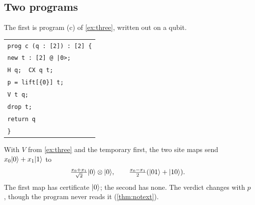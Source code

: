 \documentclass[acmsmall,screen,review,anonymous,nonacm]{acmart}
\begin{document}
\subsection{Two programs}\label{sec:meas:programs}

The first is program (c) of \cref{ex:three}, written out on a qubit.\par\nopagebreak[4]
\noindent
\begin{minipage}[t]{0.36\linewidth}
\vspace{0pt}
\small\begin{tabular}[t]{@{}l@{}}
\texttt{prog c (q : [2]) : [2] \{}\\
\texttt{\quad new t : [2] @ |0>;}\\
\texttt{\quad H q;\ \ CX q t;}\\
\texttt{\quad p = lift[\{0\}] t;}\\
\texttt{\quad V t q;}\\
\texttt{\quad drop t;}\\
\texttt{\quad return q}\\
\texttt{\}}\\
\end{tabular}
\end{minipage}\hfill
\begin{minipage}[t]{0.61\linewidth}
\vspace{0pt}
\raggedright
With $V$ from \cref{ex:three} and the temporary first, the two site
maps send $x_0\lvert 0 \rangle+x_1\lvert 1 \rangle$ to
\[
 \tfrac{x_0+x_1}{\sqrt2}\lvert 0 \rangle\otimes\lvert 0 \rangle,
 \qquad
 \tfrac{x_0-x_1}{2}(\lvert 01 \rangle+\lvert 10 \rangle).
\]
The first map has certificate $\lvert 0 \rangle$; the second has none. The verdict
changes with $p$, though the program never reads it (\cref{thm:notext}).
\end{minipage}
\end{document}
